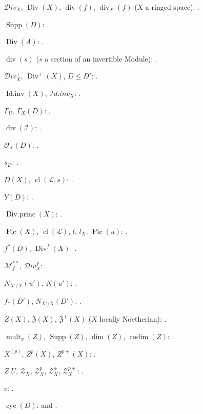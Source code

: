 $\mathcal{D}iv_X$, $\operatorname{Div}(X)$, $\operatorname{div}(f)$,
$\operatorname{div}_X(f)$ ($X$ a ringed space): .

$\operatorname{Supp}(D)$: .

$\operatorname{Div}(A)$: .

$\operatorname{div}(s)$ ($s$ a section of an invertible Module):
.

$\mathcal{D}iv_X^+$, $\operatorname{Div}^+(X)$, $D\leq D'$:
.

$\operatorname{Id.inv}(X)$, $\mathcal{I}d.inv_X$:
.

$\Gamma_U$, $\Gamma_X(D)$: .

$\operatorname{div}(\mathcal I)$: .

$\mathcal O_X(D)$: .

$s_D$: .

$D(X)$, $\operatorname{cl}(\mathcal L,s)$: .

$Y(D)$: .

$\operatorname{Div.princ}(X)$: .

$\operatorname{Pic}(X)$, $\operatorname{cl}(\mathcal L)$, $l$, $l_X$,
$\operatorname{Pic}(u)$: .

$f^*(D)$, $\operatorname{Div}^f(X)$: .

$\mathcal M_f^{**}$, $\mathcal{D}iv_X^f$: .

$N_{X'/X}(u')$, $N(u')$: .

$f_*(D')$, $N_{X'/X}(D')$: .

$Z(X)$, $\mathfrak Z(X)$, $\mathfrak Z^+(X)$
($X$ locally Noetherian): .

$\operatorname{mult}_x(Z)$, $\operatorname{Supp}(Z)$,
$\dim(Z)$, $\operatorname{codim}(Z)$: .

$X^{(p)}$, $Z^p(X)$, $Z^{p+}(X)$: .

$Z|U$, $\mathcal Z_X$, $\mathcal Z_X^p$, $\mathcal Z_X^+$,
$\mathcal Z_X^{p+}$: .

$c$: .

$\operatorname{cyc}(D)$:  and
.

